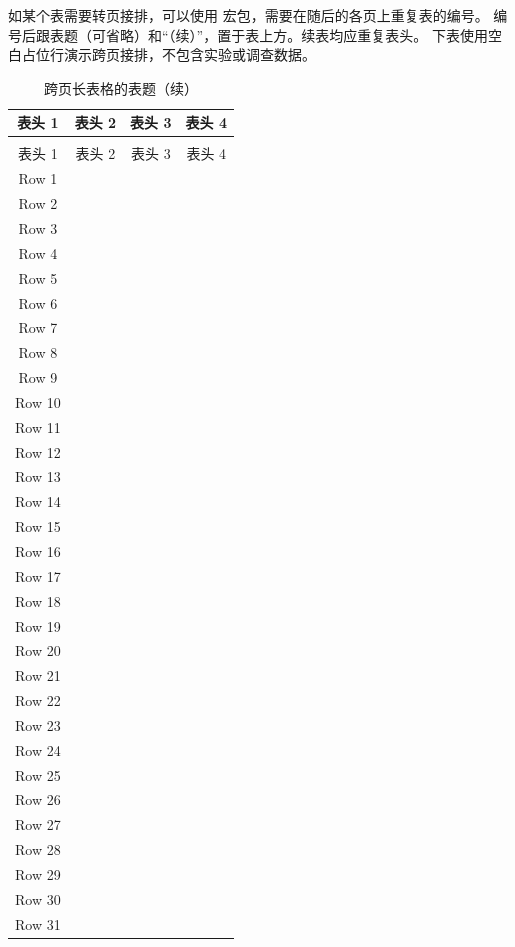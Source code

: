 如某个表需要转页接排，可以使用  宏包，需要在随后的各页上重复表的编号。
编号后跟表题（可省略）和“（续）”，置于表上方。续表均应重复表头。
下表使用空白占位行演示跨页接排，不包含实验或调查数据。

\begin{longtable}{cccc}
    \caption{跨页长表格的表题} \\
    \toprule
    表头 1 & 表头 2 & 表头 3 & 表头 4 \\
    \midrule
  \endfirsthead
    \caption[]{跨页长表格的表题（续）} \\
    \toprule
    表头 1 & 表头 2 & 表头 3 & 表头 4 \\
    \midrule
  \endhead
    \bottomrule
  \endfoot
  Row 1  & & & \\
  Row 2  & & & \\
  Row 3  & & & \\
  Row 4  & & & \\
  Row 5  & & & \\
  Row 6  & & & \\
  Row 7  & & & \\
  Row 8  & & & \\
  Row 9  & & & \\
  Row 10 & & & \\
  Row 11 & & & \\
  Row 12 & & & \\
  Row 13 & & & \\
  Row 14 & & & \\
  Row 15 & & & \\
  Row 16 & & & \\
  Row 17 & & & \\
  Row 18 & & & \\
  Row 19 & & & \\
  Row 20 & & & \\
  Row 21 & & & \\
  Row 22 & & & \\
  Row 23 & & & \\
  Row 24 & & & \\
  Row 25 & & & \\
  Row 26 & & & \\
  Row 27 & & & \\
  Row 28 & & & \\
  Row 29 & & & \\
  Row 30 & & & \\
  Row 31 & & & \\

\end{longtable}
